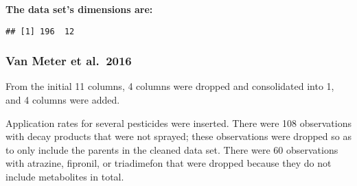 \documentclass[
]{article}
\newenvironment{Shaded}{\begin{snugshade}}{\end{snugshade}}
\newcommand{\CommentTok}[1]{\textcolor[rgb]{0.56,0.35,0.01}{\textit{#1}}}
\newcommand{\DataTypeTok}[1]{\textcolor[rgb]{0.13,0.29,0.53}{#1}}
\newcommand{\DecValTok}[1]{\textcolor[rgb]{0.00,0.00,0.81}{#1}}
\newcommand{\KeywordTok}[1]{\textcolor[rgb]{0.13,0.29,0.53}{\textbf{#1}}}
\newcommand{\NormalTok}[1]{#1}
\newcommand{\OperatorTok}[1]{\textcolor[rgb]{0.81,0.36,0.00}{\textbf{#1}}}
\newcommand{\StringTok}[1]{\textcolor[rgb]{0.31,0.60,0.02}{#1}}
\begin{document}
\textbf{The data set's dimensions are:}

\begin{verbatim}
## [1] 196  12
\end{verbatim}

\hypertarget{van-meter-et-al.-2016-1}{%
\subsubsection{Van Meter et al.~2016}\label{van-meter-et-al.-2016-1}}

From the initial 11 columns, 4 columns were dropped and consolidated
into 1, and 4 columns were added.

\begin{Shaded}
\end{Shaded}

Application rates for several pesticides were inserted. There were 108
observations with decay products that were not sprayed; these
observations were dropped so as to only include the parents in the
cleaned data set. There were 60 observations with atrazine, fipronil, or
triadimefon that were dropped because they do not include metabolites in
total.
\end{document}
